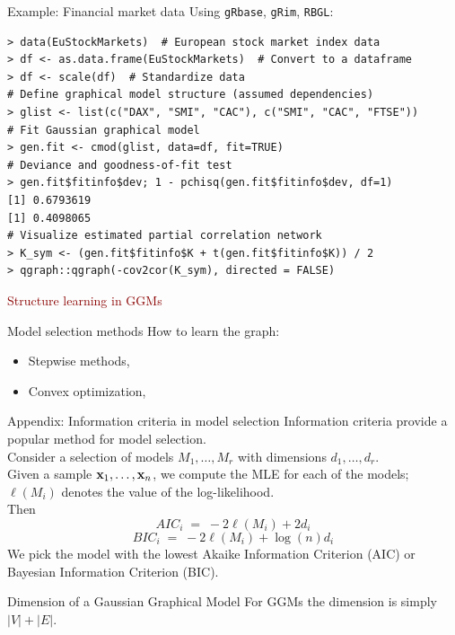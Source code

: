 \documentclass[11pt,handout,aspectratio=169,dvipsnames]{beamer}
\begin{document}
\begin{frame}[fragile]{Example: Financial market data}
	Using \texttt{gRbase}, \texttt{gRim}, \texttt{RBGL}:
\begin{lstlisting}
> data(EuStockMarkets)  # European stock market index data
> df <- as.data.frame(EuStockMarkets)  # Convert to a dataframe
> df <- scale(df)  # Standardize data
# Define graphical model structure (assumed dependencies)
> glist <- list(c("DAX", "SMI", "CAC"), c("SMI", "CAC", "FTSE"))
# Fit Gaussian graphical model
> gen.fit <- cmod(glist, data=df, fit=TRUE)
# Deviance and goodness-of-fit test
> gen.fit$fitinfo$dev; 1 - pchisq(gen.fit$fitinfo$dev, df=1)
[1] 0.6793619
[1] 0.4098065
# Visualize estimated partial correlation network
> K_sym <- (gen.fit$fitinfo$K + t(gen.fit$fitinfo$K)) / 2  
> qgraph::qgraph(-cov2cor(K_sym), directed = FALSE)   \end{lstlisting}
\end{frame}

\begin{frame}{}
\begin{center}
	{\huge \textcolor{DarkRed}{Structure learning in GGMs}}
\end{center}
\end{frame}

\begin{frame}{Model selection methods}
How to learn the graph:\\[.4cm]
\begin{itemize}
	\item Stepwise methods,\\[.4cm]
	\item Convex optimization,\\[.4cm]
\end{itemize}	
\end{frame}


\begin{frame}{Appendix: Information criteria in model selection}
	Information criteria provide a popular method for model selection.\\[3mm] 
	Consider a selection of models $M_1,\ldots,M_r$ with dimensions $d_1,\ldots,d_r$.\\[3mm] 
	Given a sample $\mathbf{x}_1,\ldots,\mathbf{x}_n$, we compute the MLE for each of the models; $\ell(M_i)$ denotes the value of the log-likelihood.\\[3mm] 
	Then
	$$
	AIC_i\;=\;-2 \ell(M_i)+2 d_i
	$$
	$$
	BIC_i\;=\;-2 \ell(M_i)+\log(n) d_i
	$$
	We pick the model with the lowest Akaike Information Criterion (AIC) or Bayesian Information Criterion (BIC).
	\begin{alertblock}{Dimension of a Gaussian Graphical Model}
		For GGMs the dimension is simply $|V|+|E|$.
	\end{alertblock}
\end{frame}
\end{document}

